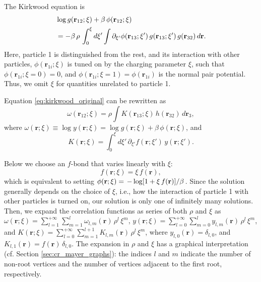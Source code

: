 \documentclass[aip,jcp,preprint,superscriptaddress,showpacs,preprintnumbers,amsmath,amssymb]{revtex4-1}
\numberwithin{equation}{section}
\newcommand{\vct}[1]{\mathbf{#1}}
\providecommand{\vr}{} %
\renewcommand{\vr}{\vct{r}}
\begin{document}
The Kirkwood equation\cite{
kirkwood1935, *hoover1962, *stell1962,
hill, *rice1965} is
%
%
%
\begin{align}
&
\log g(\vr_{12}; \xi)
+
\beta \, \phi(\vr_{12}; \xi)
\notag \\
&
=
-\beta \, \rho \,
\int_0^\xi
d\xi'
\int \partial_{\xi'} \phi(\vr_{13}; \xi') \,
  g(\vr_{13}; \xi') \, g(\vr_{32}) \, d\vr.
\label{eq:kirkwood_original}
\end{align}
%
%
%
Here,
particle 1 is distinguished from the rest,
and its interaction with other particles,
$\phi(\vr_{1i}; \xi)$
is tuned on by the charging parameter $\xi$,
such that
$\phi(\vr_{1i}; \xi = 0) = 0$,
and
$\phi(\vr_{1i}; \xi = 1) = \phi(\vr_{1i})$
is the normal pair potential.
%
Thus,
we omit $\xi$ for quantities unrelated to particle 1.



Equation \eqref{eq:kirkwood_original}
can be rewritten as
%
%
%
\begin{equation}
\omega(\vr_{12}; \xi)
=
\rho
\int
  K(\vr_{13}; \xi) \, h(\vr_{32}) \, d\vr_3,
\label{eq:kirkwood}
\end{equation}
%
%
%
where
$\omega(\vr; \xi) \equiv \log y(\vr; \xi)
=
\log g(\vr; \xi) + \beta \, \phi(\vr; \xi)$,
and
%
%
%
\begin{equation}
K(\vr; \xi)
=
\int_0^\xi
d\xi' \,
\partial_{\xi'} f(\vr; \xi') \,
y(\vr; \xi').
\label{eq:kirkwood_K}
\end{equation}



Below we choose an $f$-bond that varies linearly with $\xi$:
%
\[
  f(\vr; \xi) = \xi \, f(\vr),
\]
%
which is equivalent to setting
$\phi(\vr; \xi) =
\left.
  -\log[1 + \xi \, f(\vr)]
\middle/
  \beta
\right.$.
%
Since the solution generally
depends on the choice of $\xi$,
i.e., how the interaction of particle 1 with other particles
is turned on,
our solution is only one of infinitely many solutions.
%
Then, we expand the correlation functions
as series of both $\rho$ and $\xi$ as
%
$\omega(\vr; \xi)
=
\sum_{l = 1}^{+\infty}
\sum_{m = 1}^l
\omega_{l,m}(\vr) \, \rho^l \, \xi^m$,
%
$y(\vr; \xi)
=
\sum_{l = 0}^{+\infty}
\sum_{m = 0}^l
y_{l, m}(\vr) \, \rho^l \, \xi^m$,
%
and
$K(\vr; \xi)
=
\sum_{l = 0}^{+\infty}
\sum_{m = 1}^{l + 1}
K_{l, m}(\vr) \, \rho^l \, \xi^m$,
%
where $y_{l, 0}(\vr) = \delta_{l, 0}$,
and
%
$K_{l, 1}(\vr) = f(\vr) \, \delta_{l, 0}$.
%
The expansion in $\rho$ and $\xi$
has a graphical interpretation
(cf. Section \ref{sec:cr_mayer_graphs}):
the indices $l$ and $m$ indicate
the number of non-root vertices
and the number of vertices adjacent to the first root,
respectively.
\end{document}
